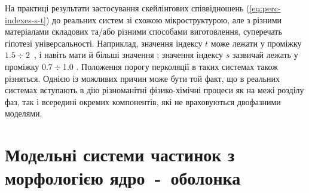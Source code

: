 \documentclass[14pt,twoside]{vakthesis}
\begin{document}
На практиці результати застосування  скейлінгових співвідношень (\ref{eq:perc-indexes-s-t}) до реальних систем зі схожою мікроструктурою, але з різними матеріалами складових та/або різними способами виготовлення, суперечать гіпотезі універсальності. Наприклад, значення індексу $t$ може лежати у проміжку $1.5\div 2$~\cite{Nan1993}, і навіть мати й більші значення \cite{Balberg1987,Nan1993}; значення індексу $s$ зазвичай лежать у проміжку $0.7 \div$1.0 \cite{Nan1993}.
Положення порогу перколяції в таких системах також різняться. 
Однією із можливих причин може бути той факт, що в реальних системах вступають в дію різноманітні фізико-хімічні процеси як на межі розділу фаз, так і всередині окремих компонентів, які не враховуються двофазними моделями. %


\section{Модельні системи частинок з морфологією ядро~-~оболонка}\label{sec:core-shell-intro}
\end{document}
